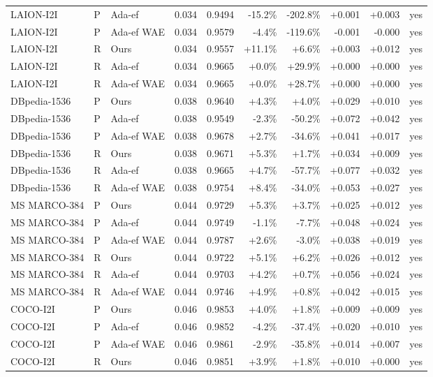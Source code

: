 \begin{tabular}{lllrrrrrrl}
LAION-I2I & P & Ada-ef & 0.034 & 0.9494 & -15.2\% & -202.8\% & +0.001 & +0.003 & yes \\
LAION-I2I & P & Ada-ef WAE & 0.034 & 0.9579 & -4.4\% & -119.6\% & -0.001 & -0.000 & yes \\
LAION-I2I & R & Ours & 0.034 & 0.9557 & +11.1\% & +6.6\% & +0.003 & +0.012 & yes \\
LAION-I2I & R & Ada-ef & 0.034 & 0.9665 & +0.0\% & +29.9\% & +0.000 & +0.000 & yes \\
LAION-I2I & R & Ada-ef WAE & 0.034 & 0.9665 & +0.0\% & +28.7\% & +0.000 & +0.000 & yes \\
DBpedia-1536 & P & Ours & 0.038 & 0.9640 & +4.3\% & +4.0\% & +0.029 & +0.010 & yes \\
DBpedia-1536 & P & Ada-ef & 0.038 & 0.9549 & -2.3\% & -50.2\% & +0.072 & +0.042 & yes \\
DBpedia-1536 & P & Ada-ef WAE & 0.038 & 0.9678 & +2.7\% & -34.6\% & +0.041 & +0.017 & yes \\
DBpedia-1536 & R & Ours & 0.038 & 0.9671 & +5.3\% & +1.7\% & +0.034 & +0.009 & yes \\
DBpedia-1536 & R & Ada-ef & 0.038 & 0.9665 & +4.7\% & -57.7\% & +0.077 & +0.032 & yes \\
DBpedia-1536 & R & Ada-ef WAE & 0.038 & 0.9754 & +8.4\% & -34.0\% & +0.053 & +0.027 & yes \\
MS MARCO-384 & P & Ours & 0.044 & 0.9729 & +5.3\% & +3.7\% & +0.025 & +0.012 & yes \\
MS MARCO-384 & P & Ada-ef & 0.044 & 0.9749 & -1.1\% & -7.7\% & +0.048 & +0.024 & yes \\
MS MARCO-384 & P & Ada-ef WAE & 0.044 & 0.9787 & +2.6\% & -3.0\% & +0.038 & +0.019 & yes \\
MS MARCO-384 & R & Ours & 0.044 & 0.9722 & +5.1\% & +6.2\% & +0.026 & +0.012 & yes \\
MS MARCO-384 & R & Ada-ef & 0.044 & 0.9703 & +4.2\% & +0.7\% & +0.056 & +0.024 & yes \\
MS MARCO-384 & R & Ada-ef WAE & 0.044 & 0.9746 & +4.9\% & +0.8\% & +0.042 & +0.015 & yes \\
COCO-I2I & P & Ours & 0.046 & 0.9853 & +4.0\% & +1.8\% & +0.009 & +0.009 & yes \\
COCO-I2I & P & Ada-ef & 0.046 & 0.9852 & -4.2\% & -37.4\% & +0.020 & +0.010 & yes \\
COCO-I2I & P & Ada-ef WAE & 0.046 & 0.9861 & -2.9\% & -35.8\% & +0.014 & +0.007 & yes \\
COCO-I2I & R & Ours & 0.046 & 0.9851 & +3.9\% & +1.8\% & +0.010 & +0.000 & yes \\

\end{tabular}
